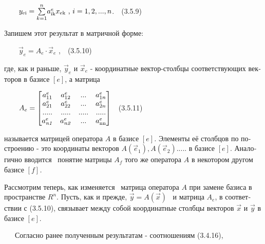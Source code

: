 \documentclass[a4paper]{article}
\newcommand\normalsubformula[1]{\text{\mathversion{normal}$#1$}}
\begin{document}
{\begin{russian}\sffamily
\ \ \ \  $y_{\normalsubformula{\text{ei}}}=\overset n{\underset{k=1}{\sum
}}a_{\normalsubformula{\text{ik}}}^ex_{\normalsubformula{\text{ek}}}\text{    , }i=1,2,...,n$.\ \ (3.5.9)
\end{russian}}

{\begin{russian}\sffamily
Запишем этот результат в матричной форме:
\end{russian}}

{\begin{russian}\sffamily
\ \ \ \  $\vec y_e=A_e\cdot \vec x_e$ ,\ \ (3.5.10)
\end{russian}}

{\begin{russian}\sffamily
где, как и раньше,  $\vec y_e$ и  $\vec x_e$ - координатные вектор-столбцы соответствующих векторов в базисе  $[e]$, а
матрица
\end{russian}}

{\begin{russian}\sffamily
\ \ \ \ 
$A_e=\left[\begin{matrix}a_{11}^e&a_{12}^e&...&a_{1n}^e\\a_{21}^e&a_{22}^e&...&a_{2n}^e\\.....&.....&.....&.....\\a_{\mathit{n1}}^e&a_{\mathit{n2}}^e&...&a_{\normalsubformula{\text{nn}}}^e\end{matrix}\right]$\ \ (3.5.11)
\end{russian}}

{\begin{russian}\sffamily
называется матрицей оператора  $A$ в базисе  $[e]$\textit{. }Элементы её столбцов по построению - это координаты
векторов  $A\left(\vec e_1\right),A\left(\vec e_2\right).....$ в базисе  $[e]$. Аналогично вводится \ понятие матрицы 
$A_f$ того же оператора\textit{ } $A$ в некотором другом базисе  $[f]$\textit{.}
\end{russian}}

{\begin{russian}\sffamily
Рассмотрим теперь, как изменяется \ матрица оператора  $A$ при замене базиса в пространстве  $R^n$. Пусть, как и прежде,
 $\vec y=A\left(\vec x\right)$ \ и матрица  $A_e$, в соответствии с (3.5.10), связывает между собой координатные
столбцы векторов  $\vec x$ и  $\vec y$ в базисе  $[e]$.
\end{russian}}

{\begin{russian}\sffamily
\ \ \ Согласно ранее полученным результатам - соотношениям (3.4.16),
\end{russian}}
\end{document}
